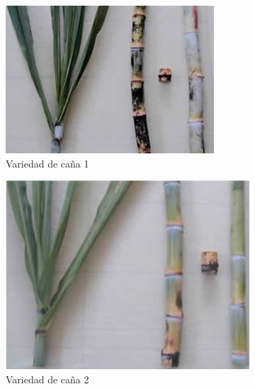 \documentclass{article}%
\begin{document}
\begin{figure}[h!]%
\begin{subfigure}{0.33\linewidth}%
\includegraphics[width=0.95\linewidth]{Cana/RD75-11.png}%
\caption{Variedad de caña 1}%
\end{subfigure}%
\begin{subfigure}{0.33\linewidth}%
\includegraphics[width=0.95\linewidth]{Cana/POJ2878.png}%
\caption{Variedad de caña 2}%
\end{subfigure}%
\begin{subfigure}{0.33\linewidth}%

\end{subfigure}
\end{figure}
\end{document}
